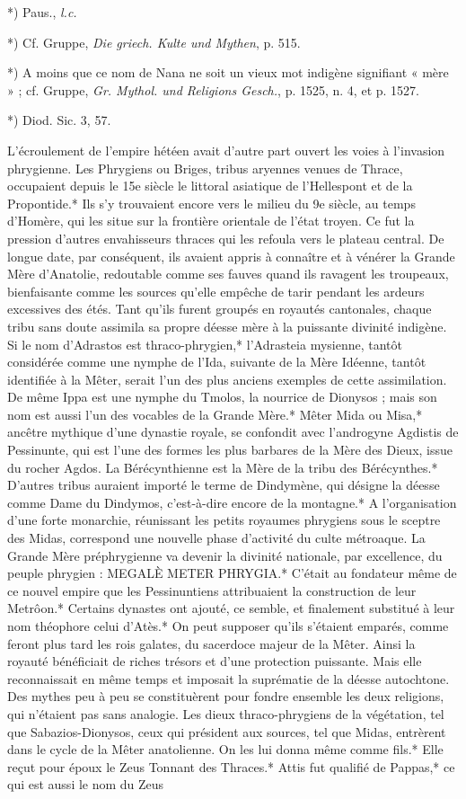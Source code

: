 \documentclass[a4paper, 11pt, oneside, polutonikogreek, french]{article}
\begin{document}
*) Paus., \emph{l.c.}

*) Cf. Gruppe, \emph{Die griech. Kulte und Mythen}, p. 515.

*) A moins que ce nom de Nana ne soit un vieux mot indigène signifiant « mère » ; cf. Gruppe, \emph{Gr. Mythol. und Religions Gesch.}, p. 1525, n. 4, et p. 1527.

*) Diod. Sic. 3, 57.

L'écroulement de l'empire hétéen avait d'autre part ouvert les voies à l'invasion phrygienne. Les Phrygiens ou Briges, tribus aryennes venues de Thrace, occupaient depuis le 15e siècle le littoral asiatique de l'Hellespont et de la Propontide.* Ils s'y trouvaient encore vers le milieu du 9e siècle, au temps d'Homère, qui les situe sur la frontière orientale de l'état troyen. Ce fut la pression d'autres envahisseurs thraces qui les refoula vers le plateau central. De longue date, par conséquent, ils avaient appris à connaître et à vénérer la Grande Mère d'Anatolie, redoutable comme ses fauves quand ils ravagent les troupeaux, bienfaisante comme les sources qu'elle empêche de tarir pendant les ardeurs excessives des étés. Tant qu'ils furent groupés en royautés cantonales, chaque tribu sans doute assimila sa propre déesse mère à la puissante divinité indigène. Si le nom d'Adrastos est thraco-phrygien,* l'Adrasteia mysienne, tantôt considérée comme une nymphe de l'Ida, suivante de la Mère Idéenne, tantôt identifiée à la Mêter, serait l'un des plus anciens exemples de cette assimilation. De même Ippa est une nymphe du Tmolos, la nourrice de Dionysos ; mais son nom est aussi l'un des vocables de la Grande Mère.* Mêter Mida ou Misa,* ancêtre mythique d'une dynastie royale, se confondit avec l'androgyne Agdistis de Pessinunte, qui est l'une des formes les plus barbares de la Mère des Dieux, issue du rocher Agdos. La Bérécynthienne est la Mère de la tribu des Bérécynthes.* D'autres tribus auraient importé le terme de Dindymène, qui désigne la déesse comme Dame du Dindymos, c'est-à-dire encore de la montagne.* A l'organisation d'une forte monarchie, réunissant les petits royaumes phrygiens sous le sceptre des Midas, correspond une nouvelle phase d'activité du culte métroaque. La Grande Mère préphrygienne va devenir la divinité nationale, par excellence, du peuple phrygien : MEGALÈ METER PHRYGIA.* C'était au fondateur même de ce nouvel empire que les Pessinuntiens attribuaient la construction de leur Metrôon.* Certains dynastes ont ajouté, ce semble, et finalement substitué à leur nom théophore celui d'Atès.* On peut supposer qu'ils s'étaient emparés, comme feront plus tard les rois galates, du sacerdoce majeur de la Mêter. Ainsi la royauté bénéficiait de riches trésors et d'une protection puissante. Mais elle reconnaissait en même temps et imposait la suprématie de la déesse autochtone. Des mythes peu à peu se constituèrent pour fondre ensemble les deux religions, qui n'étaient pas sans analogie. Les dieux thraco-phrygiens de la végétation, tel que Sabazios-Dionysos, ceux qui président aux sources, tel que Midas, entrèrent dans le cycle de la Mêter anatolienne. On les lui donna même comme fils.* Elle reçut pour époux le Zeus Tonnant des Thraces.* Attis fut qualifié de Pappas,* ce qui est aussi le nom du Zeus 
\end{document}
